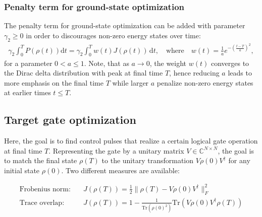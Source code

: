 \documentclass[11pt]{article}
\newcommand{\C}{\mathds{C}}
\begin{document}
\subsubsection{Penalty term for ground-state optimization}
The penalty term for ground-state optimization can be added with parameter $\gamma_2 \geq 0$ in order to discourages non-zero energy states over time:
\begin{align}
  \gamma_2 \int_0^T P(\rho(t)) \mathrm{d}t = \gamma_2 \int_0^T w(t) J\left(\rho(t)\right) \, \mathrm{d}t, \quad \text{where} \quad w(t) =
  \frac{1}{a} e^{ -\left(\frac{t-T}{a} \right)^2},
\end{align}
for a parameter $0 < a \leq 1$. Note, that as $a\to 0$, the weight $w(t)$ converges to the Dirac delta distribution with peak at final time $T$, hence reducing $a$ leads to more emphasis on the final time $T$ while larger $a$ penalize non-zero energy states at earlier times $t\leq T$. 

\subsection{Target gate optimization}

Here, the goal is to find control pulses that realize a certain logical gate
operation at final time $T$. Representing the gate by a unitary matrix $V\in
\C^{N\times N}$, the goal is to match the final state $\rho(T)$ to the unitary
transformation $V\rho(0)V^{\dagger}$ for any initial state $\rho(0)$. Two different measures are available:

\begin{align}
 \text{Frobenius norm:} \quad & J(\rho(T)) = \frac{1}{2}\| \rho(T) - V\rho(0)V^{\dagger} \|^2_F  \\
 \text{Trace overlap:} \quad  & J(\rho(T)) = 1 - \frac{1}{\mbox{Tr}\left(\rho(0)^2\right)}\mbox{Tr}\left(V\rho(0)V^{\dagger}\rho(T) \right) 
\end{align} 
\end{document}
